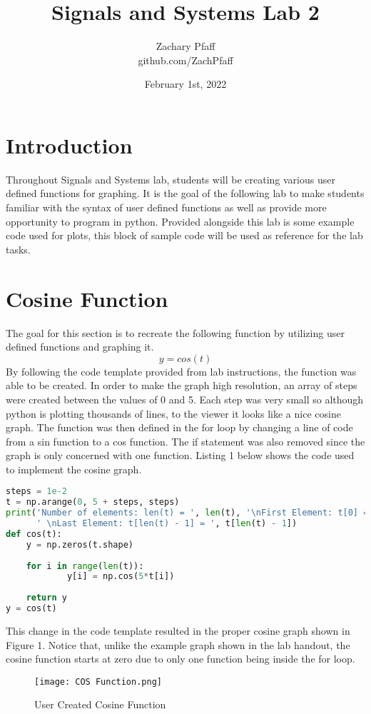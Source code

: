 \documentclass[footheight=20pt, footsepline, headhight=20pt, headsepline]{scrartcl}
\title{Signals and Systems Lab 2}
\author{Zachary Pfaff \\ github.com/ZachPfaff}
\date{February 1st, 2022}
\begin{document}
\maketitle
\section{Introduction}
\hspace{\parindent}Throughout Signals and Systems lab, students will be creating various user defined functions for graphing. It is the goal of the following lab to make students familiar with the syntax of user defined functions as well as provide more opportunity to program in python. Provided alongside this lab is some example code used for plots, this block of sample code will be used as reference for the lab tasks. 

\section{Cosine Function}
\hspace{\parindent}The goal for this section is to recreate the following function by utilizing user defined functions and graphing it.
\[ y = cos(t) \]
\hspace{\parindent}By following the code template provided from lab instructions, the function was able to be created. In order to make the graph high resolution, an array of steps were created between the values of 0 and 5. Each step was very small so although python is plotting thousands of lines, to the viewer it looks like a nice cosine graph. The function was then defined in the for loop by changing a line of code from a sin function to a cos function. The if statement was also removed since the graph is only concerned with one function. Listing 1 below shows the code used to implement the cosine graph.
\\
\begin{lstlisting}[language=Python, caption=Python example]
steps = 1e-2
t = np.arange(0, 5 + steps, steps)
print('Number of elements: len(t) = ', len(t), '\nFirst Element: t[0] = ', t[0],
      ' \nLast Element: t[len(t) - 1] = ', t[len(t) - 1])
def cos(t):
    y = np.zeros(t.shape)
    
    for i in range(len(t)):
            y[i] = np.cos(5*t[i])
            
    return y
y = cos(t)

\end{lstlisting}
\hspace{\parindent}This change in the code template resulted in the proper cosine graph shown in Figure 1. Notice that, unlike the example graph shown in the lab handout, the cosine function starts at zero due to only one function being inside the for loop.
\\
\begin{figure}
    \centering
    \texttt{[image: COS Function.png]}
    \caption{User Created Cosine Function}
    \label{Figure 1:}
\end{figure}
\hspace{\parindent}
\\
\\
\\
\end{document}
